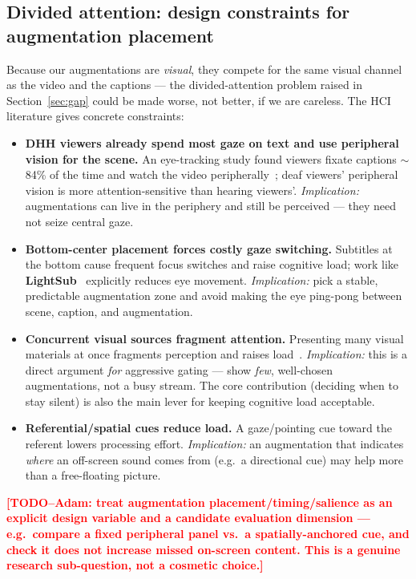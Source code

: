 \documentclass[11pt,a4paper]{article}
\newcommand{\TODO}[1]{\textcolor{red}{\textbf{[TODO--Adam: #1]}}}
\begin{document}
\subsection{Divided attention: design constraints for augmentation placement}\label{sec:placement}
Because our augmentations are \emph{visual}, they compete for the same visual channel as the video
and the captions --- the divided-attention problem raised in Section~\ref{sec:gap} could be made
worse, not better, if we are careless. The HCI literature gives concrete constraints:
\begin{itemize}
  \item \textbf{DHH viewers already spend most gaze on text and use peripheral vision for the
    scene.} An eye-tracking study found viewers fixate captions $\sim$84\% of the time and watch the
    video peripherally~\cite{captionvstranscript}; deaf viewers' peripheral vision is more
    attention-sensitive than hearing viewers'. \emph{Implication:} augmentations can live in the
    periphery and still be perceived --- they need not seize central gaze.
  \item \textbf{Bottom-center placement forces costly gaze switching.} Subtitles at the bottom cause
    frequent focus switches and raise cognitive load; work like \textbf{LightSub}~\cite{lightsub}
    explicitly reduces eye movement. \emph{Implication:} pick a stable, predictable augmentation zone
    and avoid making the eye ping-pong between scene, caption, and augmentation.
  \item \textbf{Concurrent visual sources fragment attention.} Presenting many visual materials at
    once fragments perception and raises load~\cite{captionsigncoexist}. \emph{Implication:} this is
    a direct argument \emph{for} aggressive gating --- show \emph{few}, well-chosen augmentations, not
    a busy stream. The core contribution (deciding when to stay silent) is also the main lever for
    keeping cognitive load acceptable.
  \item \textbf{Referential/spatial cues reduce load.} A gaze/pointing cue toward the referent lowers
    processing effort. \emph{Implication:} an augmentation that indicates \emph{where} an off-screen
    sound comes from (e.g.\ a directional cue) may help more than a free-floating picture.
\end{itemize}
\TODO{treat augmentation placement/timing/salience as an explicit design variable and a candidate
evaluation dimension --- e.g.\ compare a fixed peripheral panel vs.\ a spatially-anchored cue, and
check it does not increase missed on-screen content. This is a genuine research sub-question, not a
cosmetic choice.}
\end{document}
